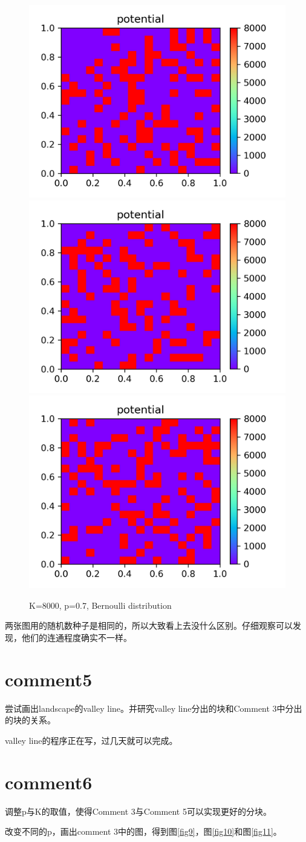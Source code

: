 \documentclass[UTF8,12pt]{article}
\begin{document}
\begin{figure}[htbp]
    \centering
    \includegraphics[width=0.3\linewidth]{pic/v04}
    \includegraphics[width=0.3\linewidth]{pic/v05}
    \includegraphics[width=0.3\linewidth]{pic/v06}
    \caption{K=8000, p=0.7, Bernoulli distribution}
    \label{fig8}
\end{figure}

两张图用的随机数种子是相同的，所以大致看上去没什么区别。仔细观察可以发现，他们的连通程度确实不一样。

\section{comment5}

尝试画出landscape的valley line。并研究valley line分出的块和Comment 3中分出的块的关系。

valley line的程序正在写，过几天就可以完成。

\section{comment6}

调整p与K的取值，使得Comment 3与Comment 5可以实现更好的分块。

改变不同的p，画出comment 3中的图，得到图\ref{fig9}，图\ref{fig10}和图\ref{fig11}。
\end{document}
